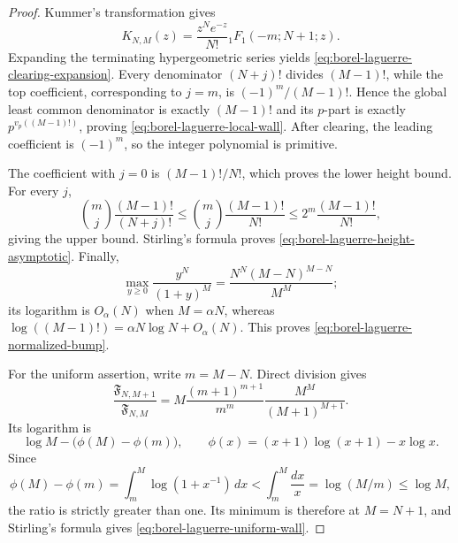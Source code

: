 \begin{proof}
Kummer's transformation gives
\[
 K_{N,M}(z)=\frac{z^Ne^{-z}}{N!}
 {}_1F_1(-m;N+1;z).
\]
Expanding the terminating hypergeometric series yields
\eqref{eq:borel-laguerre-clearing-expansion}.  Every denominator
$(N+j)!$ divides $(M-1)!$, while the top coefficient, corresponding to
$j=m$, is $(-1)^m/(M-1)!$.  Hence the global least common denominator is
exactly $(M-1)!$ and its $p$-part is exactly
$p^{v_p((M-1)!)}$, proving \eqref{eq:borel-laguerre-local-wall}.
After clearing, the leading coefficient is $(-1)^m$, so the integer
polynomial is primitive.

The coefficient with $j=0$ is $(M-1)!/N!$, which proves the lower height
bound.  For every $j$,
\[
 \binom mj\frac{(M-1)!}{(N+j)!}
 \leq\binom mj\frac{(M-1)!}{N!}
 \leq2^m\frac{(M-1)!}{N!},
\]
giving the upper bound.  Stirling's formula proves
\eqref{eq:borel-laguerre-height-asymptotic}.  Finally,
\[
 \max_{y\geq0}\frac{y^N}{(1+y)^M}
 =\frac{N^N(M-N)^{M-N}}{M^M};
\]
its logarithm is $O_\alpha(N)$ when $M=\alpha N$, whereas
$\log((M-1)!)=\alpha N\log N+O_\alpha(N)$.  This proves
\eqref{eq:borel-laguerre-normalized-bump}.

For the uniform assertion, write $m=M-N$.  Direct division gives
\[
 \frac{\mathfrak F_{N,M+1}}{\mathfrak F_{N,M}}
 =M\frac{(m+1)^{m+1}}{m^m}
   \frac{M^M}{(M+1)^{M+1}}.
\]
Its logarithm is
\[
 \log M-\bigl(\phi(M)-\phi(m)\bigr),
 \qquad
 \phi(x)=(x+1)\log(x+1)-x\log x.
\]
Since
\[
 \phi(M)-\phi(m)
 =\int_m^M\log(1+x^{-1})\,dx
 <\int_m^M\frac{dx}{x}
 =\log(M/m)\leq\log M,
\]
the ratio is strictly greater than one.  Its minimum is therefore at
$M=N+1$, and Stirling's formula gives
\eqref{eq:borel-laguerre-uniform-wall}.
\end{proof}
